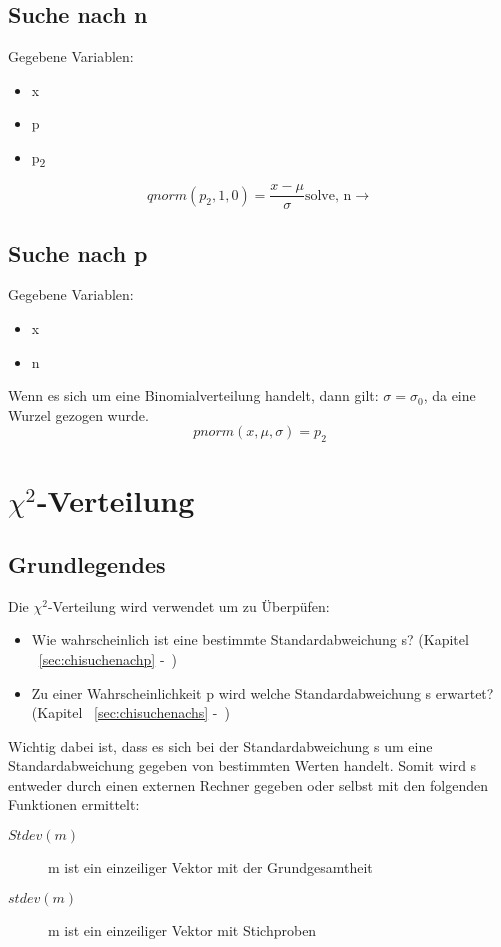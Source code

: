 \documentclass[a4paper,10pt]{article}
\begin{document}
\subsection{Suche nach n}
Gegebene Variablen:
\begin{itemize}
\item x
\item p
\item p\textsubscript{2}
\end{itemize}
\begin{equation}
  qnorm(p_2, 1, 0) = \frac{x -\mu}{\sigma} \text{solve, n} \rightarrow
\end{equation}

\subsection{Suche nach p}
Gegebene Variablen:
\begin{itemize}
\item x
\item n
\end{itemize}
Wenn es sich um eine Binomialverteilung handelt, dann gilt: $ \sigma =
\sigma_0 $, da eine Wurzel gezogen wurde.
\begin{equation}
  pnorm(x, \mu, \sigma) = p_2
\end{equation}

\section{$ \chi ^2 $-Verteilung}
\subsection{Grundlegendes}
\label{sec:chiquadratverteilunggrundlegendes}
Die $ \chi ^2 $-Verteilung wird verwendet um zu Überpüfen:
\begin{itemize}
\item Wie wahrscheinlich ist eine bestimmte Standardabweichung s?
  (Kapitel ~\autoref{sec:chisuchenachp} -~)
\item Zu einer Wahrscheinlichkeit p wird welche Standardabweichung s
  erwartet? (Kapitel ~\autoref{sec:chisuchenachs}
  -~)
\end{itemize}

Wichtig dabei ist, dass es sich bei der Standardabweichung s um eine
Standardabweichung gegeben von bestimmten Werten handelt. Somit wird s
entweder durch einen externen Rechner gegeben oder selbst mit den
folgenden Funktionen ermittelt:
\begin{description}
\item[$ Stdev(m) $] m ist ein einzeiliger Vektor mit der Grundgesamtheit
\item[$ stdev(m) $] m ist ein einzeiliger Vektor mit Stichproben
\end{description}
\end{document}
